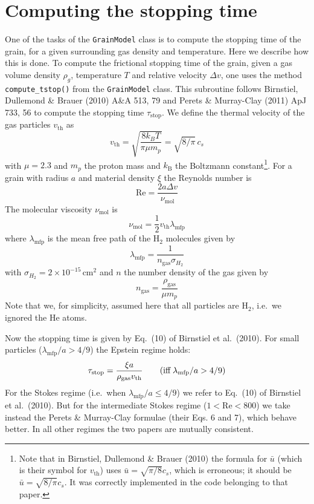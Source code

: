 \documentclass{book}
\newcommand{\code}[1]{{\small\tt #1}}
\begin{document}
\section{Computing the stopping time}
\label{sec-grain-compute-tstop}
%
One of the tasks of the \code{GrainModel} class is to compute the
stopping time of the grain, for a given surrounding gas density and
temperature. Here we describe how this is done.
To compute the frictional stopping time of the grain, given a gas volume density
$\rho_g$, temperature $T$ and relative velocity $\Delta v$, one uses the method
\code{compute\_tstop()} from the \code{GrainModel} class.
This subroutine follows Birnstiel, Dullemond \&
Brauer (2010) A\&A 513, 79 and Perets \& Murray-Clay (2011) ApJ 733, 56
to compute the stopping time $\tau_{\mathrm{stop}}$.
We define the thermal velocity of the gas particles $v_{\mathrm{th}}$ as
\begin{equation}
v_{\mathrm{th}} = \sqrt{\frac{8k_BT}{\pi \mu m_p}} = \sqrt{8/\pi}\,c_s
\end{equation}
with $\mu=2.3$ and $m_p$ the proton mass and $k_{\mathrm{B}}$ the Boltzmann
constant\footnote{Note that in Birnstiel, Dullemond \& Brauer (2010) the formula
  for $\bar u$ (which is their symbol for $v_{\mathrm{th}}$) uses $\bar
  u=\sqrt{\pi/8}c_s$, which is erroneous; it should be $\bar
  u=\sqrt{8/\pi}c_s$. It was correctly implemented in the code belonging to that
  paper.}. For a grain with radius $a$ and material density $\xi$ the Reynolds
number is
\begin{equation}
\mathrm{Re} = \frac{2a\Delta v}{\nu_{\mathrm{mol}}}
\end{equation}
The molecular viscosity $\nu_{\mathrm{mol}}$ is
\begin{equation}
\nu_{\mathrm{mol}} = \frac{1}{2}v_{\mathrm{th}}\lambda_{\mathrm{mfp}}
\end{equation}
where $\lambda_{\mathrm{mfp}}$ is the mean free path of the H$_2$ molecules
given by
\begin{equation}
\lambda_{\mathrm{mfp}} = \frac{1}{n_{\mathrm{gas}}\sigma_{H_{2}}}
\end{equation}
with $\sigma_{H_{2}}=2\times 10^{-15}\,\mathrm{cm}^2$ and $n$ the number density
of the gas given by
\begin{equation}
n_{\mathrm{gas}} = \frac{\rho_{\mathrm{gas}}}{\mu m_p}
\end{equation}
Note that we, for simplicity, assumed here that all particles are H$_2$, i.e.~we
ignored the He atoms.

Now the stopping time is given by Eq.~(10) of Birnstiel et al.~(2010). For small
particles ($\lambda_{\mathrm{mfp}}/a>4/9$) the Epstein regime holds:
\begin{equation}
  \tau_{\mathrm{stop}} = \frac{\xi a}{\rho_{\mathrm{gas}}v_{\mathrm{th}}}\qquad (\hbox{iff}\; \lambda_{\mathrm{mfp}}/a>4/9)
\end{equation}
For the Stokes regime (i.e.~when $\lambda_{\mathrm{mfp}}/a\le 4/9$) we refer to
Eq.~(10) of Birnstiel et al.~(2010). But for the intermediate Stokes regime
($1<\mathrm{Re}<800$) we take instead the Perets \& Murray-Clay formulae
(their Eqs. 6 and 7), which behave better. In all other regimes the two papers
are mutually consistent.
\end{document}
